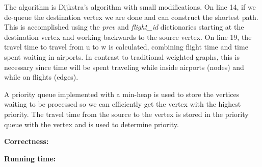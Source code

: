\documentclass[11pt]{article}
\newcommand\correctness{\vspace{.10in}\textbf{Correctness: }}
\newcommand\runtime{\vspace{.10in}\textbf{Running time: }}
\begin{document}
The algorithm is Dijkstra's algorithm with small modifications. On line 14, if we de-queue the destination vertex we are done and can construct the shortest path. This is accomplished using the \textit{prev} and \textit{flight\_id} dictionaries starting at the destination vertex and working backwards to the source vertex. On line 19, the travel time to travel from u to w is calculated, combining flight time and time spent waiting in airports. In contrast to traditional weighted graphs, this is necessary since time will be spent traveling while inside airports (nodes) and while on flights (edges).

A priority queue implemented with a min-heap is used to store the vertices waiting to be processed so we can efficiently get the vertex with the highest priority. The travel time from the source to the vertex is stored in the priority queue with the vertex and is used to determine priority.

\correctness

\runtime
\end{document}
